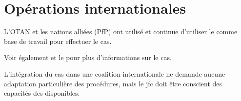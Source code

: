 \section{Opérations internationales}

L'OTAN et les nations alliées (PfP) ont utilisé et continue d'utiliser le  comme base de travail pour effectuer le \gls{cas}.

Voir également  et le  pour plus d'informations sur le \gls{cas}.

L'intégration du \gls{cas} dans une coalition internationale ne demande aucune adaptation particulière des procédures, mais le \gls{jfc} doit être conscient des capacités des \ja{} disponibles.